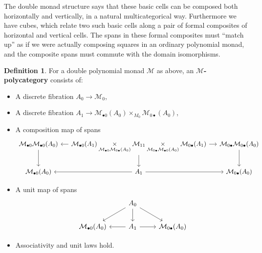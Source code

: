 \documentclass{article}
\theoremstyle{definition}
\newtheorem{defn}[thm]{Definition}
\theoremstyle{remark}
\def\M{\mathcal{M}}
\def\Mh{\M_{\bullet 0}}
\def\Mv{\M_{0\bullet}}
\begin{document}
The double monad structure says that these basic cells can be composed both horizontally and vertically, in a natural multicategorical way.
Furthermore we have cubes, which relate two such basic cells along a pair of formal composites of horizontal and vertical cells.
The spans in these formal composites must ``match up'' as if we were actually composing squares in an ordinary polynomial monad, and the composite spans must commute with the domain isomorphisms.

\begin{defn}
  For a double polynomial monad $\M$ as above, an \textbf{$\M$-polycategory} consists of:
  \begin{itemize}
  \item A discrete fibration $A_0 \to \M_0$,
  \item A discrete fibration $A_1 \to \Mh(A_0) \times_{M_0} \Mv(A_0)$,
  \item A composition map of spans
    \[
    \begin{tikzcd}[column sep=small]
      \Mh\Mh(A_0) \ar[d] & \Mh(A_1)\underset{\Mh\Mv(A_0)}{\times} \M_{11} \underset{\Mv\Mh(A_0)}\times \Mv(A_1) \ar[l] \ar[r] \ar[d] & \Mv\Mv(A_0) \ar[d]\\
      \Mh(A_0) & A_1 \ar[l] \ar[r] & \Mv(A_0)
    \end{tikzcd}
    \]
  \item A unit map of spans
    \[
    \begin{tikzcd}
      & A_0\ar[dl] \ar[d] \ar[dr] \\
      \Mh(A_0) & A_1 \ar[l] \ar[r] & \Mv(A_0)
    \end{tikzcd}
    \]
  \item Associativity and unit laws hold.
  \end{itemize}
\end{defn}
\end{document}
